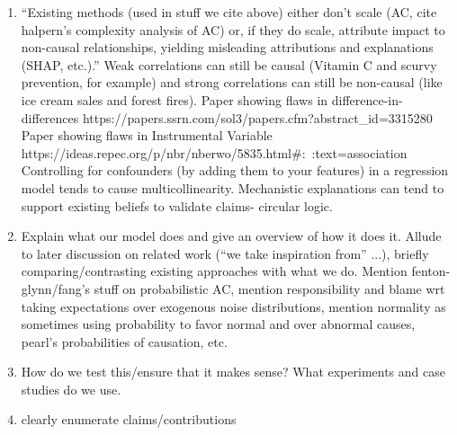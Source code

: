\documentclass{article}
\begin{document}
\begin{enumerate}
Causal Analysis on engineering using physical/mechanistic framework for identifying what caused an accident https://pdfs.semanticscholar.org/8a0a/714936bd21c52fd7f215c174f05eb7e25529.pdf
    \item ``Existing methods (used in stuff we cite above) either don't scale (AC, cite halpern's complexity analysis of AC) or, if they do scale, attribute impact to non-causal relationships, yielding misleading attributions and explanations (SHAP, etc.).''
Weak correlations can still be causal (Vitamin C and scurvy prevention, for example) and strong correlations can still be non-causal (like ice cream sales and forest fires).
Paper showing flaws in difference-in-differences https://papers.ssrn.com/sol3/papers.cfm?abstract_id=3315280
Paper showing flaws in Instrumental Variable https://ideas.repec.org/p/nbr/nberwo/5835.html#:~:text=association%
Controlling for confounders (by adding them to your features) in a regression model tends to cause multicollinearity.
Mechanistic explanations can tend to support existing beliefs to validate claims- circular logic.
    \item Explain what our model does and give an overview of how it does it. Allude to later discussion on related work (``we take inspiration from'' ...), briefly comparing/contrasting existing approaches with what we do. Mention fenton-glynn/fang's stuff on probabilistic AC, mention responsibility and blame wrt taking expectations over exogenous noise distributions, mention normality as sometimes using probability to favor normal and over abnormal causes, pearl's probabilities of causation, etc.
    \item How do we test this/ensure that it makes sense? What experiments and case studies do we use.
    \item clearly enumerate claims/contributions
\end{enumerate}




 
\end{document}
